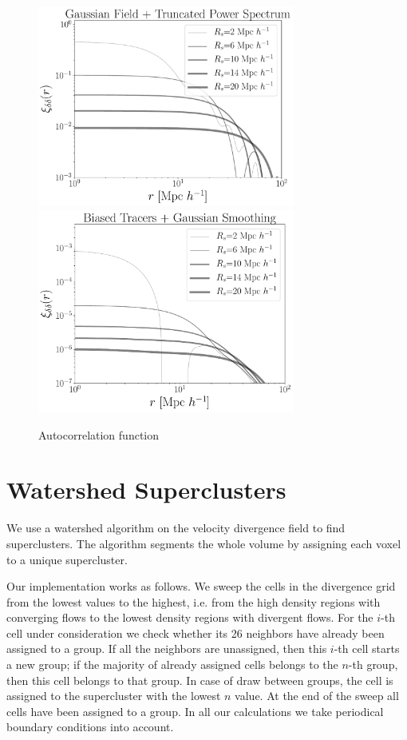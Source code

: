\documentclass[usenatbib]{mnras}
\begin{document}
\begin{figure}
    \centering
    \includegraphics[width=240pt]{plot_corrfunc_field_rs.pdf}
    \includegraphics[width=240pt]{plot_corrfunc_tracers_rs.pdf}
    \caption{Autocorrelation function}
    \label{fig:autocorrelation}
\end{figure}

\section{Watershed Superclusters}

We use a watershed algorithm \citep{BeucherWatershed1979} on the velocity divergence field to find
superclusters.
The algorithm segments the whole volume by assigning each voxel to a unique supercluster. 

Our implementation works as follows. 
We sweep the cells in the divergence grid from the lowest values to the highest, i.e. from
the high density regions with converging flows to the lowest density regions with divergent
flows.
For the $i$-th cell under consideration we check whether its 26 neighbors have already been assigned to a group. 
If all the neighbors are unassigned, then this $i$-th cell starts a
new group; if the majority of already assigned cells belongs to the
$n$-th group, then this cell belongs to that group.
In case of draw between groups, the cell is assigned to the supercluster with the lowest $n$ value.
At the end of the sweep all cells have been assigned to a group. 
In all our calculations we take periodical boundary conditions into
account.  
\end{document}
